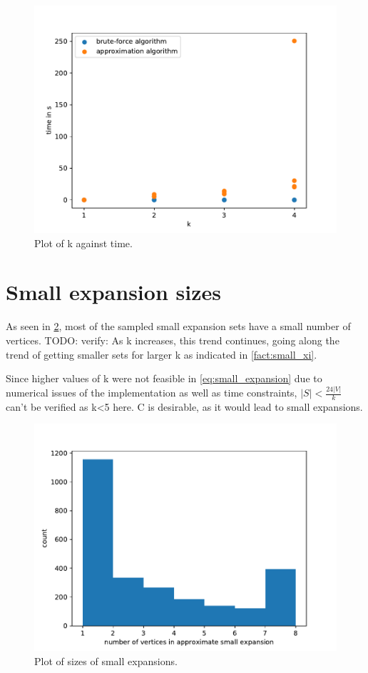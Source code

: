 \begin{figure}
	\centering
	\includegraphics[scale=0.8]{figures/k_all_logs.pdf}
	\caption[Plot k time ]{Plot of k against time.\label{fig:k_time}}
\end{figure}

\section{Small expansion sizes}

As seen in \cref{fig:sizes_small_expansions}, most of the sampled small expansion sets have a small number of vertices. TODO: verify: As k increases, this trend continues, going along the trend of getting smaller sets for larger k as indicated in \cref{fact:small_xi}.


Since higher values of k were not feasible in \cref{eq:small_expansion} due to numerical issues of the implementation as well as time constraints, $|S|<\frac{24|V|}{k}$ can't be verified as k<5 here.
C is desirable, as it would lead to small expansions.

\begin{figure}
	\centering
	\includegraphics[scale=1]{figures/quality_evaluation_log_small_expansion_sizes.pdf}
	\caption[Plot sizes small expansions]{Plot of sizes of small expansions.\label{fig:sizes_small_expansions}}
\end{figure}


